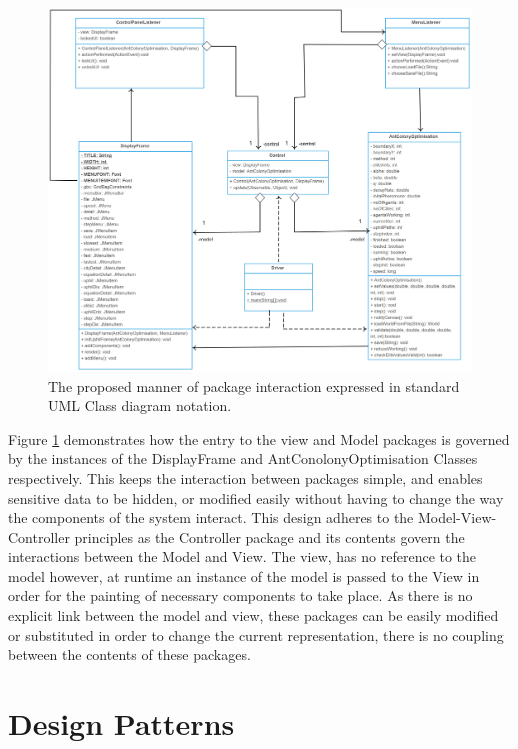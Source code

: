 \clearpage
\begin{figure}
\includegraphics[scale=0.22]{Images/chapter4/overallClassinteraction}
\caption{The proposed manner of package interaction expressed in standard UML Class diagram notation.}
\label{fig:interacttion}
\end{figure}
\clearpage

Figure \ref{fig:interacttion} demonstrates how the entry to the view and Model packages is governed by the instances of the DisplayFrame and AntConolonyOptimisation Classes respectively. This keeps the interaction between packages simple, and enables sensitive data to be hidden, or modified easily without having to change the way the components of the system interact. This design adheres to the Model-View-Controller principles as the Controller package and its contents govern the interactions between the Model and View. The view, has no reference to the model however, at runtime an instance of the model is passed to the View in order for the painting of necessary components to take place. As there is no explicit link between the model and view, these packages can be easily modified or substituted in order to change the current representation, there is no coupling between the contents of these packages.


\section{Design Patterns}
